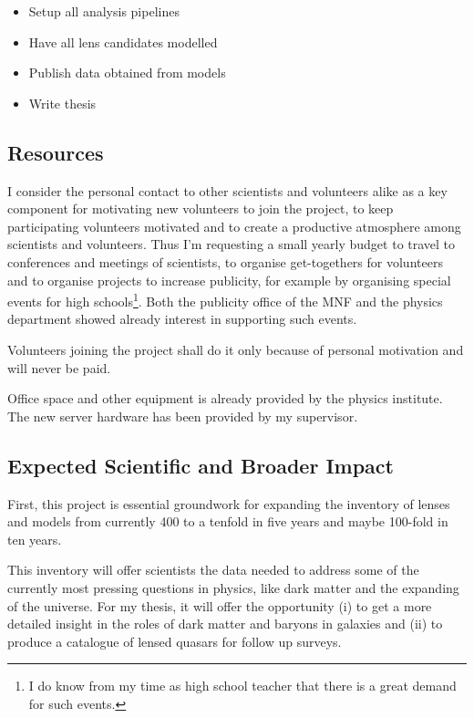 \documentclass[11pt]{article}
\begin{document}
\begin{itemize}
  \item Setup all analysis pipelines
  \item Have all lens candidates modelled
  \item Publish data obtained from models
  \item Write thesis
\end{itemize}
  
  

\subsection{Resources}

I consider the personal contact to other scientists and volunteers alike as a key component for motivating new volunteers to join the project, to keep participating volunteers motivated and to create a productive atmosphere among scientists and volunteers.
Thus I'm requesting a small yearly budget to travel to conferences and meetings of scientists, to organise get-togethers for volunteers and to organise projects to increase publicity, for example by organising special events for high schools\footnote{I do know from my time as high school teacher that there is a great demand for such events.}. Both the publicity office of the MNF and the physics department showed already interest in supporting such events.

Volunteers joining the project shall do it only because of personal motivation and will never be paid.

Office space and other equipment is already provided by the physics institute.
The new server hardware has been provided by my supervisor.





\subsection{Expected Scientific and Broader Impact}

First, this project is essential groundwork for expanding the inventory of lenses and models from currently 400 to a tenfold in five years and maybe 100-fold in ten years.

This inventory will offer scientists the data needed to address some of the currently most pressing questions in physics, like dark matter and the expanding of the universe.
For my thesis, it will offer the opportunity (i) to get a more detailed insight in the roles of dark matter and baryons in galaxies and (ii) to produce a catalogue of lensed quasars for follow up surveys.
\end{document}
